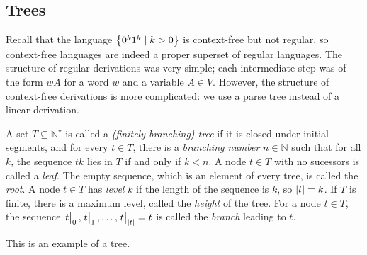 \subsection{Trees}
Recall that the language \( \qty{0^k1^k \mid k > 0} \) is context-free but not regular, so context-free languages are indeed a proper superset of regular languages.
The structure of regular derivations was very simple; each intermediate step was of the form \( wA \) for a word \( w \) and a variable \( A \in V \).
However, the structure of context-free derivations is more complicated: we use a parse tree instead of a linear derivation.
\begin{definition}
	A set \( T \subseteq \mathbb N^\star \) is called a \emph{(finitely-branching) tree} if it is closed under initial segments, and for every \( t \in T \), there is a \emph{branching number} \( n \in \mathbb N \) such that for all \( k \), the sequence \( tk \) lies in \( T \) if and only if \( k < n \).
	A node \( t \in T \) with no sucessors is called a \emph{leaf}.
	The empty sequence, which is an element of every tree, is called the \emph{root}.
	A node \( t \in T \) has \emph{level} \( k \) if the length of the sequence is \( k \), so \( \abs{t} = k \).
	If \( T \) is finite, there is a maximum level, called the \emph{height} of the tree.
	For a node \( t \in T \), the sequence \( \eval{t}_0, \eval{t}_1, \dots, \eval{t}_{\abs{t}} = t \) is called the \emph{branch} leading to \( t \).
\end{definition}
\begin{example}
	This is an example of a tree.
	\begin{center}
	\end{center}
\end{example}
